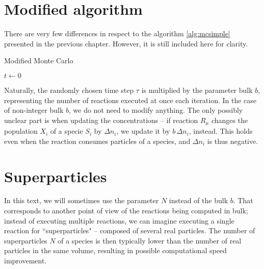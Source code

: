 \section{Modified algorithm}

There are very few differences in respect to the algorithm \ref{alg:mcsimple} presented in the previous chapter. However, it is still included here for clarity.

\begin{algorithm}
\caption{Modified Monte Carlo}\label{alg:mcadvanced}

$t \gets 0$\\
\end{algorithm}

Naturally, the randomly chosen time step $\tau$ is multiplied by the parameter bulk $b$, representing the number of reactions executed at once each iteration. In the case of non-integer bulk $b$, we do not need to modify anything. The only possibly unclear part is when updating the concentrations -- if reaction $R_\mu$ changes the population $X_i$ of a specie $S_i$ by $\Delta n_i$, we update it by $b\, \Delta n_i$, instead. This holds even when the reaction consumes particles of a species, and $\Delta n_i$ is thus negative.

\section{Superparticles}

In this text, we will sometimes use the parameter $N$ instead of the bulk $b$. That corresponds to another point of view of the reactions being computed in bulk; instead of executing multiple reactions, we can imagine executing a single reaction for ``superparticles" -- composed of several real particles. The number of superparticles $N$ of a species is then typically lower than the number of real particles in the same volume, resulting in possible computational speed improvement.


